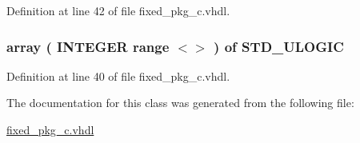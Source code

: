 Definition at line 42 of file fixed\+\_\+pkg\+\_\+c.\+vhdl.

\hypertarget{classfixed__pkg_ae78bc2b36d22f6abeac163955e8a587d}{}
\subsubsection[{U\+N\+R\+E\+S\+O\+L\+V\+E\+D\+\_\+ufixed}]{ {\bfseries \textcolor{keywordflow}{array}\textcolor{vhdlchar}{ }\textcolor{vhdlchar}{(}\textcolor{vhdlchar}{ }\textcolor{comment}{I\+N\+T\+E\+G\+E\+R}\textcolor{vhdlchar}{ }\textcolor{keywordflow}{range}\textcolor{vhdlchar}{ }\textcolor{vhdlchar}{$<$$>$}\textcolor{vhdlchar}{ }\textcolor{vhdlchar}{)}\textcolor{vhdlchar}{ }\textcolor{vhdlchar}{ }\textcolor{keywordflow}{of}\textcolor{vhdlchar}{ }\textcolor{comment}{S\+T\+D\+\_\+\+U\+L\+O\+G\+I\+C}\textcolor{vhdlchar}{ }} \hspace{0.3cm}{\ttfamily [Type]}}\label{classfixed__pkg_ae78bc2b36d22f6abeac163955e8a587d}


Definition at line 40 of file fixed\+\_\+pkg\+\_\+c.\+vhdl.



The documentation for this class was generated from the following file\+:\begin{DoxyCompactItemize}
\item 
\hyperlink{fixed__pkg__c_8vhdl}{fixed\+\_\+pkg\+\_\+c.\+vhdl}\end{DoxyCompactItemize}
